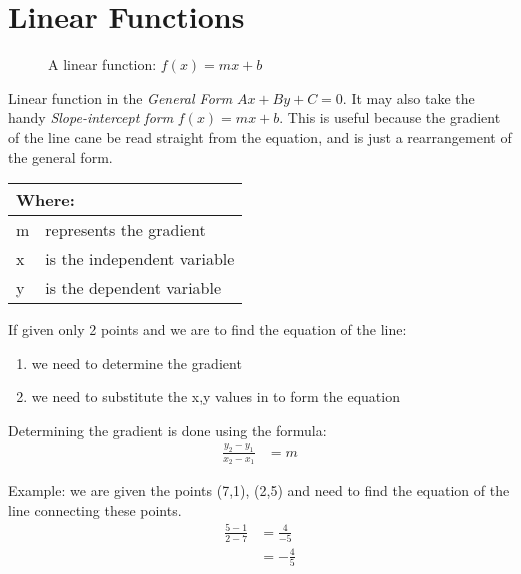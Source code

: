 %
\clearpage
\section{Linear Functions}
\label{sec:LinearFunctions}
\begin{figure}[!hbt]
\label{fig:FuncGraphLinear}
\caption{A linear function: $f(x) = mx + b$}
\end{figure}
%
Linear function in the \emph{General Form} $Ax + By + C= 0$. It may also take
the handy \emph{Slope-intercept form} $ f(x) = mx + b $. This is useful because
the gradient of the line cane be read straight from the equation, and is just
a rearrangement of the general form. 
\begin{table}[!hbt]
\label{tab:PartsOfALinearFunction}
\begin{tabularx}{\linewidth}{| l X |}
  \hline
  \multicolumn{2}{|l|}{Where:} \\
  \hline \hline
  m & represents the gradient\\
  x & is the independent variable\\
  y & is the dependent variable\\
\hline
\end{tabularx}
\end{table}

If given only 2 points and we are to find the equation of the line:
\begin{enumerate}
  \item we need to determine the gradient
  \item we need to substitute the x,y values in to form the equation
\end{enumerate}

Determining the gradient is done using the formula:
\begin{align}
  \frac{y_{2} - y_{1}}{x_{2} - x_{1}} & = m
\end{align}

Example: we are given the points (7,1), (2,5) and need to find the equation of
the line connecting these points.
\begin{align}
  \frac{5 - 1}{2 - 7} & = \frac{4}{-5}\\
    & = -\frac{4}{5}
\end{align}

